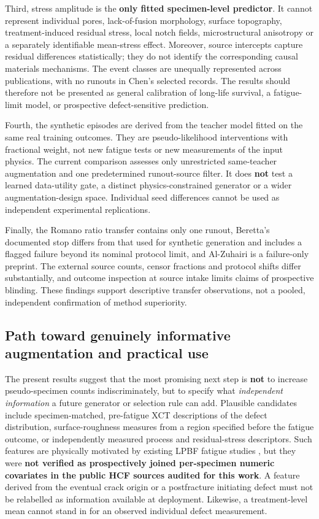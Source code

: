 \documentclass[12pt,a4paper]{article}
\begin{document}
Third, stress amplitude is the \textbf{only fitted specimen-level predictor}. It cannot represent individual pores, lack-of-fusion morphology, surface topography, treatment-induced residual stress, local notch fields, microstructural anisotropy or a separately identifiable mean-stress effect. Moreover, source intercepts capture residual differences statistically; they do not identify the corresponding causal materials mechanisms. The event classes are unequally represented across publications, with no runouts in Chen's selected records. The results should therefore not be presented as general calibration of long-life survival, a fatigue-limit model, or prospective defect-sensitive prediction.

Fourth, the synthetic episodes are derived from the teacher model fitted on the same real training outcomes. They are pseudo-likelihood interventions with fractional weight, not new fatigue tests or new measurements of the input physics. The current comparison assesses only unrestricted same-teacher augmentation and one predetermined runout-source filter. It does \textbf{not} test a learned data-utility gate, a distinct physics-constrained generator or a wider augmentation-design space. Individual seed differences cannot be used as independent experimental replications.

Finally, the Romano ratio transfer contains only one runout, Beretta's documented stop differs from that used for synthetic generation and includes a flagged failure beyond its nominal protocol limit, and Al-Zuhairi is a failure-only preprint. The external source counts, censor fractions and protocol shifts differ substantially, and outcome inspection at source intake limits claims of prospective blinding. These findings support descriptive transfer observations, not a pooled, independent confirmation of method superiority.

\subsection{Path toward genuinely informative augmentation and practical use}

The present results suggest that the most promising next step is \textbf{not} to increase pseudo-specimen counts indiscriminately, but to specify what \emph{independent information} a future generator or selection rule can add. Plausible candidates include specimen-matched, pre-fatigue XCT descriptions of the defect distribution, surface-roughness measures from a region specified before the fatigue outcome, or independently measured process and residual-stress descriptors. Such features are physically motivated by existing LPBF fatigue studies \cite{wu2021,vanderrest2025}, but they were \textbf{not verified as prospectively joined per-specimen numeric covariates in the public HCF sources audited for this work}. A feature derived from the eventual crack origin or a postfracture initiating defect must not be relabelled as information available at deployment. Likewise, a treatment-level mean cannot stand in for an observed individual defect measurement.
\end{document}
